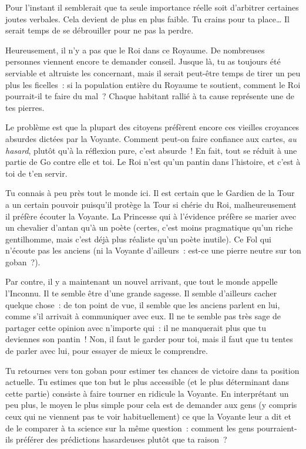 {{Pour l’instant il semblerait que ta seule importance réelle soit d’arbitrer certaines joutes verbales.
Cela devient de plus en plus faible.
Tu crains pour ta place…  Il serait temps de se débrouiller pour ne pas la perdre.

Heureusement, il n’y a pas que le Roi dans ce Royaume.
De nombreuses personnes viennent encore te demander conseil.
Jusque là, tu as toujours été serviable et altruiste les concernant, mais il serait peut-être temps de tirer un peu plus les ficelles~:
si la population entière du Royaume te soutient, comment le Roi pourrait-il te faire du mal~?
Chaque habitant rallié à ta cause représente une de tes pierres.

Le problème est que la plupart des citoyens préfèrent encore ces vieilles croyances absurdes dictées par la Voyante.
Comment peut-on faire confiance aux cartes, \emph{au hasard}, plutôt qu’à la réflexion pure, c’est absurde~!
En fait, tout se réduit à une partie de Go contre elle et toi.
Le Roi n’est qu’un pantin dans l’histoire, et c’est à toi de t’en servir.

Tu connais à peu près tout le monde ici.
Il est certain que le Gardien de la Tour a un certain pouvoir puisqu’il protège la Tour si chérie du Roi, malheureusement il préfère écouter la Voyante.
La Princesse qui à l’évidence préfère se marier avec un chevalier d’antan qu’à un poète (certes, c’est moins pragmatique qu’un riche gentilhomme, mais c’est déjà plus réaliste qu’un poète inutile).
Ce Fol qui n’écoute pas les anciens (ni la Voyante d’ailleurs~: est-ce une pierre neutre sur ton goban~?).

Par contre, il y a maintenant un nouvel arrivant, que tout le monde appelle l’Inconnu.
Il te semble être d’une grande sagesse.
Il semble d’ailleurs cacher quelque chose~: de ton point de vue, il semble que les anciens parlent en lui, comme s’il arrivait à communiquer avec eux.
Il ne te semble pas très sage de partager cette opinion avec n’importe qui~: il ne manquerait plus que tu deviennes son pantin~!
Non, il faut le garder pour toi, mais il faut que tu tentes de parler avec lui, pour essayer de mieux le comprendre.

Tu retournes vers ton goban pour estimer tes chances de victoire dans ta position actuelle.
Tu estimes que ton but le plus accessible (et le plus déterminant dans cette partie) consiste à faire tourner en ridicule la Voyante.
En interprétant un peu plus, le moyen le plus simple pour cela est de demander aux gens (y compris ceux qui ne viennent pas te voir habituellement) ce que la Voyante leur a dit et de le comparer à ta science sur la même question~:  comment les gens pourraient-ils préférer des prédictions hasardeuses plutôt que ta raison~?
}

}

